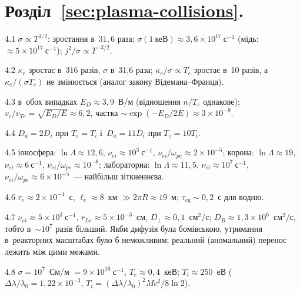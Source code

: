\protect \section *{Розділ~\ref *{sec:plasma-collisions}. }
\begin{Solution}{4.{1}}
		$\sigma\propto T^{3/2}$: зростання в~$31{,}6$ раза; $\sigma(1~\text{кеВ})\approx3{,}6\times10^{17}~\mathrm{с}^{-1}$ (мідь: $\approx5\times10^{17}~\mathrm{с}^{-1}$); $j^2/\sigma\propto T^{-3/2}$.
	
\end{Solution}
\begin{Solution}{4.{2}}
		$\kappa_e$ зростає в~316 разів, $\sigma$ в~31,6 раза; $\kappa_e/\sigma\propto T_e$ зростає в~10 разів, а~$\kappa_e/(\sigma T_e)$ не змінюється
		(аналог закону Відемана--Франца).
	
\end{Solution}
\begin{Solution}{4.{3}}
		в~обох випадках $E_D\approx3{,}9$~В/м (відношення $n/T_e$ однакове);
	$v_c/v_{Te}=\sqrt{E_D/E}\approx6{,}2$, частка $\sim\exp(-E_D/2E)\approx3\times10^{-9}$.
	
\end{Solution}
\begin{Solution}{4.{4}}
		$D_a=2D_i$ при $T_e=T_i$ і~$D_a=11D_i$ при $T_e=10T_i$.
	
\end{Solution}
\begin{Solution}{4.{5}}
		іоносфера: $\ln\Lambda\approx12{,}6$, $\nu_{ei}\approx10^{3}~\mathrm{с}^{-1}$, $\nu_{ei}/\omega_{pe}\approx2\times10^{-5}$;
	корона: $\ln\Lambda\approx19$, $\nu_{ei}\approx6~\mathrm{с}^{-1}$, $\nu_{ei}/\omega_{pe}\approx10^{-8}$;
	лабораторна: $\ln\Lambda\approx11{,}5$, $\nu_{ei}\approx10^{7}~\mathrm{с}^{-1}$, $\nu_{ei}/\omega_{pe}\approx6\times10^{-5}$~--- найбільш зіткненнєва.
	
\end{Solution}
\begin{Solution}{4.{6}}
		$\tau_e\approx2\times10^{-4}$~с, $\ell_e\approx8$~км $\gg2\pi R\approx19$~м;
	$\tau_{eq}\sim0{,}2$~с для водню.
	
\end{Solution}
\begin{Solution}{4.{7}}
		$\nu_{ei}\approx5\times10^{3}~\mathrm{с}^{-1}$, $r_{Le}\approx5\times10^{-3}$~см, $D_\perp\approx0{,}1$~см$^2$/с;
	$D_B\approx1{,}3\times10^{6}$~см$^2$/с, тобто в~$\sim10^{7}$ разів більший. Якби дифузія була бомівською,
	утримання в~реакторних масштабах було б неможливим; реальний (аномальний) перенос лежить між цими межами.
	
\end{Solution}
\begin{Solution}{4.{8}}
		$\sigma=10^{7}$~См/м $=9\times10^{16}~\mathrm{с}^{-1}$, $T_e\approx0{,}4$~кеВ; $T_i\approx250$~еВ
	($\Delta\lambda/\lambda_0=1{,}22\times10^{-3}$, $T_i=(\Delta\lambda/\lambda_0)^2Mc^2/8\ln2$).
	
\end{Solution}
